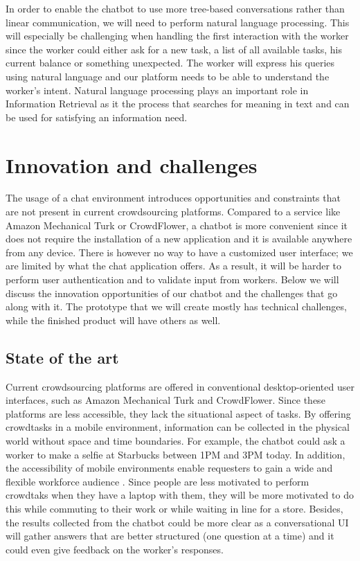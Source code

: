 \documentclass[a4paper,dutch,fleqn]{exam}
\begin{document}
In order to enable the chatbot to use more tree-based conversations rather than linear communication, we will need to perform natural language processing. This will especially be challenging when handling the first interaction with the worker since the worker could either ask for a new task, a list of all available tasks, his current balance or something unexpected. The worker will express his queries using natural language and our platform needs to be able to understand the worker's intent. 
Natural language processing plays an important role in Information Retrieval as it the process that searches for meaning in text and can be used for satisfying an information need. 

\section{Innovation and challenges}

The usage of a chat environment introduces opportunities and constraints that are not present in current crowdsourcing platforms. Compared to a service like Amazon Mechanical Turk or CrowdFlower, a chatbot is more convenient since it does not require the installation of a new application and it is available anywhere from any device. There is however no way to have a customized user interface; we are limited by what the chat application offers. As a result, it will be harder to perform user authentication and to validate input from workers. Below we will discuss the innovation opportunities of our chatbot and the challenges that go along with it. The prototype that we will create mostly has technical challenges, while the finished product will have others as well.

\subsection{State of the art}
Current crowdsourcing platforms are offered in conventional desktop-oriented user interfaces, such as Amazon Mechanical Turk and CrowdFlower. Since these platforms are less accessible, they lack the situational aspect of tasks. By offering crowdtasks in a mobile environment, information can be collected in the physical world without space and time boundaries. For example, the chatbot could ask a worker to make a selfie at Starbucks between 1PM and 3PM today. 
In addition, the accessibility of mobile environments enable requesters to gain a wide and flexible workforce audience \cite{gupta2012mclerk}. Since people are less motivated to perform crowdtaks when they have a laptop with them, they will be more motivated to do this while commuting to their work or while waiting in line for a store. Besides, the results collected from the chatbot could be more clear as a conversational UI will gather answers that are better structured (one question at a time) and it could even give feedback on the worker's responses. 
\end{document}

